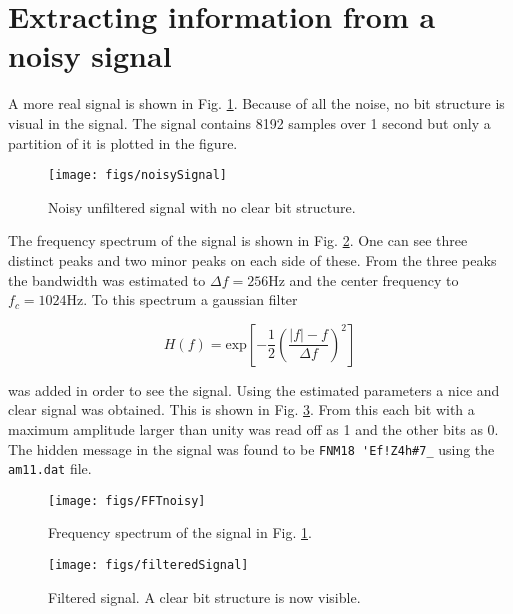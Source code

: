 \section{Extracting information from a noisy signal}

A more real signal is shown in Fig. \ref{fig:noisySignal}. Because of all the noise, no bit structure is visual in the signal. The signal contains 8192 samples over 1 second but only a partition of it is plotted in the figure.

\begin{figure}[H]
  \centering
  \texttt{[image: figs/noisySignal]}
  \caption{Noisy unfiltered signal with no clear bit structure.}
  \label{fig:noisySignal}
\end{figure}

The frequency spectrum of the signal is shown in Fig. \ref{fig:FFTnoisy}. One can see three distinct peaks and two minor peaks on each side of these. From the three peaks the bandwidth was estimated to $\Delta f = 256$Hz and the center frequency to $f_c = 1024$Hz. To this spectrum a gaussian filter

\begin{equation}
  \label{eq:gaussfilt}
  H(f) = \text{exp}\left[-\frac{1}{2}\left(\frac{|f|-f}{\Delta f}\right)^2\right]
\end{equation}

was added in order to see the signal. Using the estimated parameters a nice and clear signal was obtained. This is shown in Fig. \ref{fig:filteredSignal}. From this each bit with a maximum amplitude larger than unity was read off as 1 and the other bits as 0. The hidden message in the signal was found to be \verb|FNM18 'Ef!Z4h#7_| using the \verb|am11.dat| file.

\begin{figure}[H]
  \centering
  \texttt{[image: figs/FFTnoisy]}
  \caption{Frequency spectrum of the signal in Fig. \ref{fig:noisySignal}.}
  \label{fig:FFTnoisy}
\end{figure}

\begin{figure}[H]
  \centering
  \texttt{[image: figs/filteredSignal]}
  \caption{Filtered signal. A clear bit structure is now visible.}
  \label{fig:filteredSignal}
\end{figure}
